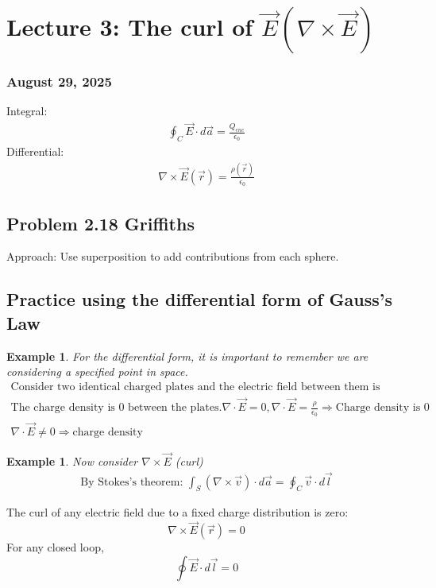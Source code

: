 \documentclass{article}
\newtheorem{example}[theorem]{Example}
\begin{document}
\section{Lecture 3: The curl of $\vec{E}(\nabla\times\vec{E})$}
\subsubsection*{August 29, 2025}
\begin{conceptbox}
Integral:
\begin{align*}
    \oint_C \vec{E} \cdot d\vec{a} = \frac{Q_{enc}}{\epsilon_0}
\end{align*}
Differential:
\begin{align*}
    \nabla\times\vec{E}(\vec{r}) = \frac{\rho(\vec{r})}{\epsilon_0}
\end{align*}
\end{conceptbox}

\subsection{Problem 2.18 Griffiths}
Approach: Use superposition to add contributions from each sphere.

\subsection{Practice using the differential form of Gauss's Law}
\begin{example}
    For the differential form, it is important to remember we are considering a specified point in space.
\begin{align*}
    \text{Consider two identical charged plates and the electric field between them is constant.} \\
    \text{The charge density is $0$ between the plates.} \nabla\cdot\vec{E}=0, \nabla\cdot\vec{E}=\frac{\rho}{\epsilon_0} \Rightarrow \text{Charge density is 0} \\
    \nabla\cdot\vec{E}\neq0 \Rightarrow \text{charge density}
\end{align*}
\end{example}

\begin{example}
    Now consider $\nabla\times\vec{E}$ (curl)
    \begin{align*}
        \text{By Stokes's theorem: } \int_S (\nabla \times \vec{v}) \cdot d\vec{a} = \oint_C \vec{v} \cdot d\vec{l}
    \end{align*}
\end{example}
\begin{conceptbox}
The curl of any electric field due to a fixed charge distribution is zero:
\[
\nabla \times \vec{E}(\vec{r}) = 0
\]
For any closed loop,
\[
\oint \vec{E} \cdot d\vec{l} = 0
\]
\end{conceptbox}
\newpage
\end{document}
